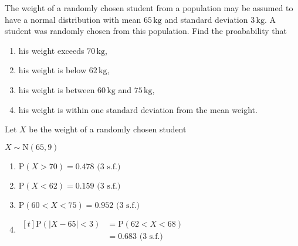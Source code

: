 \documentclass[11pt,a4paper]{book}
\begin{document}
\begin{example}

The weight of a randomly chosen student from a population may be assumed
to have a normal distribution with mean $65\,\text{kg}$ and standard
deviation $3\,\text{kg}$. A student was randomly chosen from this
population. Find the proabability that

\begin{enumerate}[label=(\alph*)]

\item  his weight exceeds $\text{70}\,\text{kg}$,

\item  his weight is below $\text{62}\,\text{kg}$,

\item  his weight is between $60\,\text{kg}$ and $75\,\text{kg}$,

\item  his weight is within one standard deviation from the mean
weight.

\end{enumerate}

\Solution

Let $X$ be the weight of a randomly chosen student

$X\sim\text{N}\left(65,9\right)$

\begin{enumerate}[label=(\alph*)]

\item  $\text{P}\left(X>70\right)=0.478\text{ (3 s.f.)}$

\item  $\text{P}\left(X<62\right)=0.159\text{ (3 s.f.)}$

\item  $\text{P}\left(60<X<75\right)=0.952\text{ (3 s.f.)}$

\item
$
\begin{aligned}[t]
\text{P}\left(\left|X-65\right|<3\right) & =\text{P}\left(62<X<68\right)\\
 & =0.683\text{ (3 s.f.)}
\end{aligned}
$

\end{enumerate}

\end{example}
\end{document}
